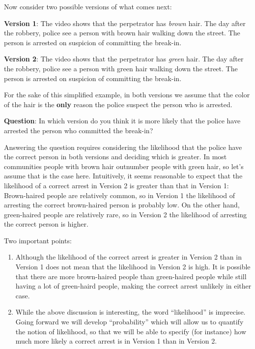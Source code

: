 \documentclass[
]{book}
\begin{document}
Now consider two possible versions of what comes next:

\textbf{Version 1}: The video shows that the perpetrator has \emph{brown} hair.
The day after the robbery, police see a person with brown hair walking down the street.
The person is arrested on suspicion of committing the break-in.

\textbf{Version 2}: The video shows that the perpetrator has \emph{green} hair. The
day after the robbery, police see a person with green hair walking down the street.
The person is arrested on suspicion of committing the break-in.

For the sake of this simplified example,
in both versions we assume that the color of the hair is the \textbf{only} reason the
police suspect the person who is arrested.

\textbf{Question}: In which version do you think it is more likely that the police have
arrested the person who committed the break-in?

Answering the question requires considering the likelihood that the police have
the correct person in both versions and deciding which is greater.
In most communities people with brown hair outnumber people with green hair,
so let's assume that is the case here. Intuitively,
it seems reasonable to expect that the likelihood of a correct arrest in Version 2 is greater
than that in Version 1:
Brown-haired people are relatively common, so in Version 1 the likelihood of
arresting the correct brown-haired person is probably low.
On the other hand, green-haired people are relatively rare, so in Version 2
the likelihood of arresting the correct person is higher.

Two important points:

\begin{enumerate}
\def\labelenumi{\arabic{enumi})}
\item
  Although the likelihood of the correct arrest is greater in Version 2
  than in Version 1 does not mean that the likelihood in Version 2 is high.
  It is possible that there are more brown-haired people than green-haired people
  while still having a lot of green-haird people, making the correct arrest
  unlikely in either case.
\item
  While the above discussion is interesting, the word ``likelihood'' is
  imprecise. Going forward we will develop ``probability'' which
  will allow us to quantify the notion of likelihood, so that we will be able
  to specify (for instance) how much more likely a correct arrest is in
  Version 1 than in Version 2.
\end{enumerate}
\end{document}
